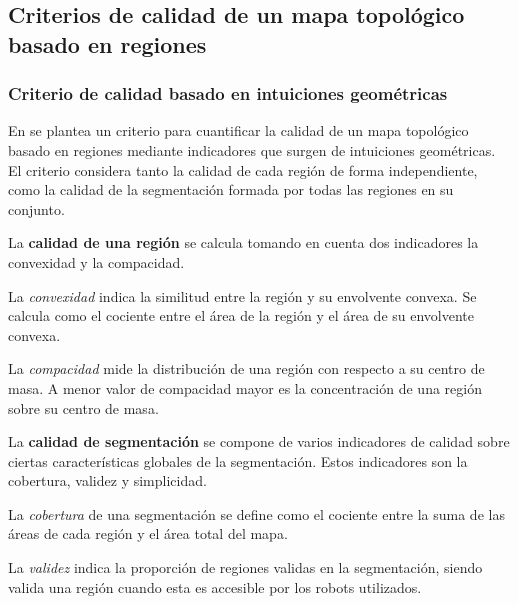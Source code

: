 
\subsection{Criterios de calidad de un mapa topológico basado en regiones} \label{sec:evalTop}
\subsubsection{Criterio de calidad basado en intuiciones geométricas}
En \cite{Liu2015} se plantea un criterio para cuantificar la calidad de un mapa
topológico basado en regiones mediante indicadores que surgen de intuiciones
geométricas. El criterio considera tanto la calidad de cada región de forma
independiente, como la calidad de la segmentación formada por todas las
regiones en su conjunto.

La \textbf{calidad de una región} se calcula tomando en cuenta dos indicadores
la convexidad y la compacidad. 

La \emph{convexidad} indica la similitud entre la región y su envolvente
convexa. Se calcula como el cociente entre el área de la región y el área de
su envolvente convexa. 

La \emph{compacidad} mide la distribución de una región con respecto
a su centro de masa. A menor valor de compacidad mayor es la concentración de
una región sobre su centro de masa.

La \textbf{calidad de segmentación} se compone de varios indicadores de
calidad sobre ciertas características globales de la segmentación. Estos indicadores son la
cobertura, validez y simplicidad.

La \emph{cobertura} de una segmentación se define como el cociente entre la
suma de las áreas de cada región y el área total del mapa.

La \emph{validez} indica la proporción de regiones validas en la segmentación, siendo valida una
región cuando esta es accesible por los robots utilizados.

